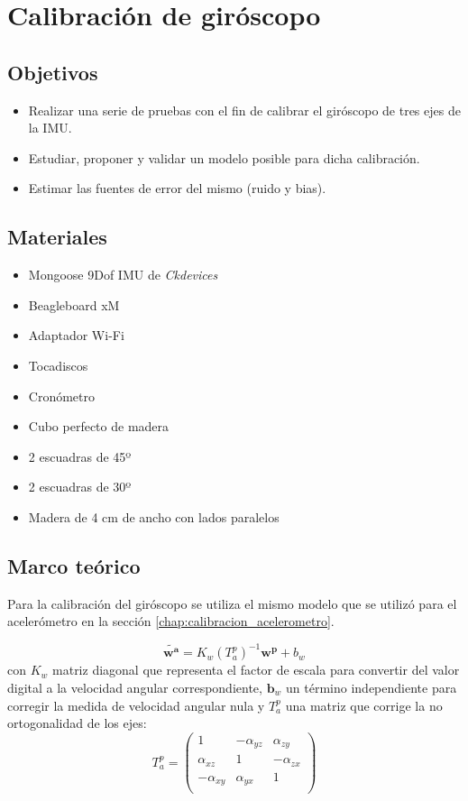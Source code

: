 \documentclass[main]{subfiles}
\begin{document}
\chapter{Calibración de giróscopo}

\section{Objetivos}

\begin{itemize}
	\item Realizar una serie de pruebas con el fin de calibrar el giróscopo de tres ejes de la IMU.
	\item Estudiar, proponer y validar un modelo posible para dicha calibración.
	\item Estimar las fuentes de error del mismo (ruido y bias).
\end{itemize}

\section{Materiales}
\begin{itemize}
\item Mongoose 9Dof IMU de \emph{Ckdevices}
\item Beagleboard xM
\item Adaptador Wi-Fi 
\item Tocadiscos
\item Cronómetro
\item Cubo perfecto de madera
\item 2 escuadras de 45º
\item 2 escuadras de 30º
\item Madera de 4 cm de ancho con lados paralelos
\end{itemize}

\section{Marco teórico}
Para la calibración del giróscopo se utiliza el mismo modelo que se utilizó para el acelerómetro en la sección \ref{chap:calibracion_acelerometro}.

$$\tilde{\mathbf{w^a}}=K_w(T_a^p)^{-1}\mathbf{w^p}+b_w$$
con $K_w$ matriz diagonal que representa el factor de escala para convertir del valor digital a la velocidad angular correspondiente, $\mathbf{b}_w$ un término independiente para corregir la medida de velocidad angular nula y $T^p_a$ una matriz que corrige la no ortogonalidad de los ejes:
$$T^p_a=\left( 
\begin{matrix}
1 &-\alpha_{yz} &\alpha_{zy}\\
\alpha_{xz} &1& -\alpha_{zx} \\
-\alpha_{xy} &\alpha_{yx} &1\\
\end{matrix} 
\right)$$
\end{document}
